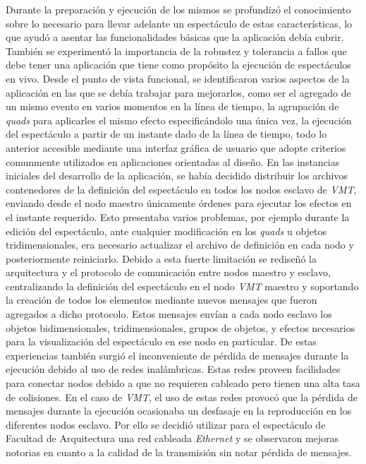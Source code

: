 Durante la preparación y ejecución de los mismos se profundizó el conocimiento sobre lo necesario para llevar adelante un espectáculo de estas características, lo que ayudó a asentar las funcionalidades básicas que la aplicación debía cubrir. También se experimentó la importancia de la robustez y tolerancia a fallos que debe tener una aplicación que tiene como propósito la ejecución de espectáculos en vivo.
Desde el punto de vista funcional, se identificaron varios aspectos de la aplicación en las que se debía trabajar para mejorarlos, como ser el agregado de un mismo evento en varios momentos en la línea de tiempo, la agrupación de \emph{quads} para aplicarles el mismo efecto especificándolo una única vez, la ejecución del espectáculo a partir de un instante dado de la línea de tiempo, todo lo anterior accesible mediante una interfaz gráfica de usuario que adopte criterios comunmente utilizados en aplicaciones orientadas al diseño.
En las instancias iniciales del desarrollo de la aplicación, se había decidido distribuir los archivos contenedores de la definición del espectáculo en todos los nodos esclavo de \emph{VMT}, enviando desde el nodo maestro únicamente órdenes para ejecutar los efectos en el instante requerido.
Esto presentaba varios problemas, por ejemplo durante la edición del espectáculo, ante cualquier modificación en los \emph{quads} u objetos tridimensionales, era necesario actualizar el archivo de definición en cada nodo y posteriormente reiniciarlo.
Debido a esta fuerte limitación se rediseñó la arquitectura y el protocolo de comunicación entre nodos maestro y esclavo, centralizando la definición del espectáculo en el nodo \emph{VMT} maestro y soportando la creación de todos los elementos mediante nuevos mensajes que fueron agregados a dicho protocolo. Estos mensajes envían a cada nodo esclavo los objetos bidimensionales, tridimensionales, grupos de objetos, y efectos necesarios para la visualización del espectáculo en ese nodo en particular.
De estas experiencias también surgió el inconveniente de pérdida de mensajes durante la ejecución debido al uso de redes inalámbricas. Estas redes proveen facilidades para conectar nodos debido a que no requieren cableado pero tienen una alta tasa de colisiones. En el caso de \emph{VMT}, el uso de estas redes provocó que la pérdida de mensajes durante la ejecución ocasionaba un desfasaje en la reproducción en los diferentes nodos esclavo. Por ello se decidió utilizar para el espectáculo de Facultad de Arquitectura una red cableada \emph{Ethernet} y se observaron mejoras notorias en cuanto a la calidad de la transmisión sin notar pérdida de mensajes.

